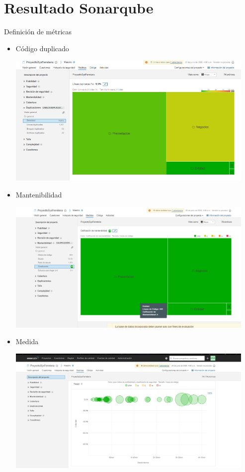 \documentclass[preprint,12pt]{elsarticle}
\begin{document}
\section{Resultado Sonarqube}
	Definición de métricas
	\begin{itemize}
	    \item Código duplicado
	\begin{center}
	\includegraphics[width=12cm]{./imagen/8} 
	\end{center}
	\item Mantenibilidad
	\begin{center}
	\includegraphics[width=12cm]{./imagen/9} 
	\end{center}
	\item Medida
		\begin{center}
	\includegraphics[width=12cm]{./imagen/10} 
	\end{center}
	\end{itemize}
\end{document}
